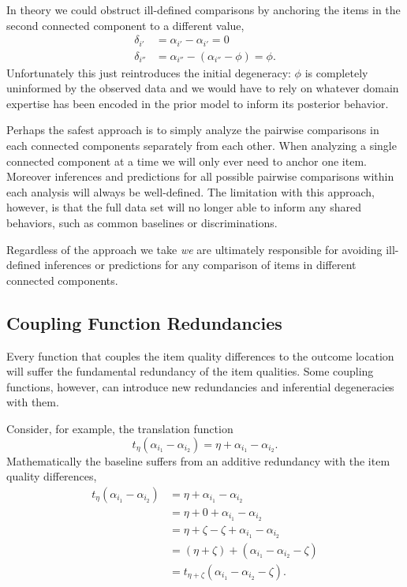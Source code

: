 \documentclass[
  letterpaper,
  DIV=11,
  numbers=noendperiod]{scrartcl}
\begin{document}
In theory we could obstruct ill-defined comparisons by anchoring the
items in the second connected component to a different value,
\begin{align*}
\delta_{i'} &= \alpha_{i'} - \alpha_{i'} = 0
\\
\delta_{i''} &= \alpha_{i''} - (\alpha_{i''} - \phi) = \phi.
\end{align*} Unfortunately this just reintroduces the initial
degeneracy: \(\phi\) is completely uninformed by the observed data and
we would have to rely on whatever domain expertise has been encoded in
the prior model to inform its posterior behavior.

Perhaps the safest approach is to simply analyze the pairwise
comparisons in each connected components separately from each other.
When analyzing a single connected component at a time we will only ever
need to anchor one item. Moreover inferences and predictions for all
possible pairwise comparisons within each analysis will always be
well-defined. The limitation with this approach, however, is that the
full data set will no longer able to inform any shared behaviors, such
as common baselines or discriminations.

Regardless of the approach we take \emph{we} are ultimately responsible
for avoiding ill-defined inferences or predictions for any comparison of
items in different connected components.

\subsection{Coupling Function
Redundancies}\label{coupling-function-redundancies}

Every function that couples the item quality differences to the outcome
location will suffer the fundamental redundancy of the item qualities.
Some coupling functions, however, can introduce new redundancies and
inferential degeneracies with them.

Consider, for example, the translation function \[
t_{\eta} ( \alpha_{i_{1}} - \alpha_{i_{2}} )
=
\eta + \alpha_{i_{1}} - \alpha_{i_{2}}.
\] Mathematically the baseline suffers from an additive redundancy with
the item quality differences, \begin{align*}
t_{\eta} ( \alpha_{i_{1}} - \alpha_{i_{2}} )
&=
\eta + \alpha_{i_{1}} - \alpha_{i_{2}}
\\
&=
\eta + 0 + \alpha_{i_{1}} - \alpha_{i_{2}}
\\
&=
\eta + \zeta - \zeta + \alpha_{i_{1}} - \alpha_{i_{2}}
\\
&=
(\eta + \zeta) + (\alpha_{i_{1}} - \alpha_{i_{2}} - \zeta)
\\
&=
t_{\eta + \zeta} (\alpha_{i_{1}} - \alpha_{i_{2}} - \zeta ).
\end{align*}
\end{document}
